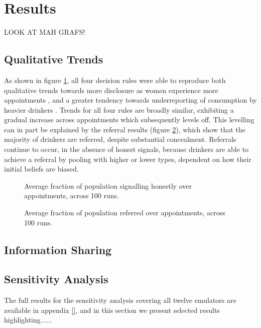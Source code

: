 \section{Results}
\label{sec:results}

LOOK AT MAH GRAFS!

\subsection{Qualitative Trends}
\label{sub:qt_results}

As shown in figure \ref{fig:qt_honesty}, all four decision rules were able to reproduce both qualitative trends towards more disclosure as women experience more appointments \citep{Phillips2007}, and a greater tendency towards underreporting of consumption by heavier drinkers \citep{Alvik2006}.  Trends for all four rules are broadly similar, exhibiting a gradual increase across appointments which subsequently levels off. This levelling can in part be explained by the referral results (figure \ref{fig:qt_ref}), which show that the majority of drinkers are referred, despite substantial concealment. Referrals continue to occur, in the absence of honest signals, because drinkers are able to achieve a referral by pooling with higher or lower types, dependent on how their initial beliefs are biased.

\begin{figure}[h!]
\caption{Average fraction of population signalling honestly over appointments, across 100 runs.}
\label{fig:qt_honesty}
\end{figure}

\begin{figure}[h!]
\caption{Average fraction of population referred over appointments, across 100 runs.}
\label{fig:qt_ref}
\end{figure}

\subsection{Information Sharing}
\label{sub:sharing_results}



\subsection{Sensitivity Analysis}
\label{sub:sa_results}

The full results for the sensitivity analysis covering all twelve emulators are available in appendix \ref{}, and in this section we present selected results highlighting......

